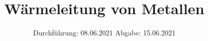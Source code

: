 

\subject{204}
\title{Wärmeleitung von Metallen}
\date{%
  Durchführung: 08.06.2021
  \hspace{3em}
  Abgabe: 15.06.2021
}



\maketitle
\thispagestyle{empty}
\tableofcontents
\newpage



%




\printbibliography{}


